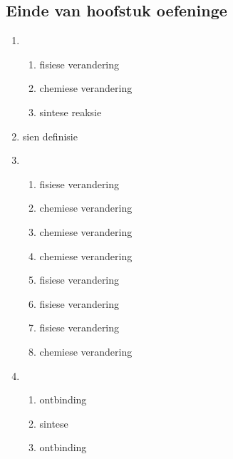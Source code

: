 \subsection{Einde van hoofstuk oefeninge}
\begin{multicols}{3}
 \begin{enumerate}[noitemsep, label=\textbf{(\arabic*)} ]
  \item 
 \begin{enumerate}[noitemsep, label=\textbf{(\alph*)} ]
\item fisiese verandering
\item chemiese verandering
\item sintese reaksie
\end{enumerate}
\item sien definisie
\item 
 \begin{enumerate}[noitemsep, label=\textbf{(\alph*)} ]
\item fisiese verandering
\item chemiese verandering
\item chemiese verandering
\item chemiese verandering
\item fisiese verandering
\item fisiese verandering
\item fisiese verandering
\item chemiese verandering
\end{enumerate}
\item
 \begin{enumerate}[noitemsep, label=\textbf{(\alph*)} ]
\item ontbinding
\item sintese
\item ontbinding
\end{enumerate}
 \end{enumerate}
\end{multicols}

